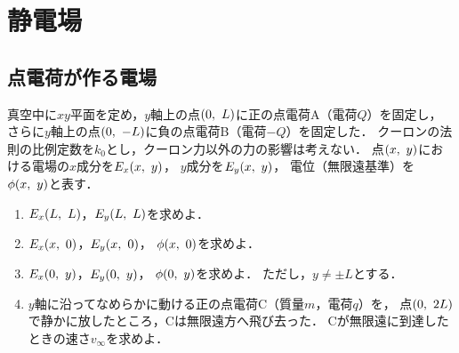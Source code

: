 \documentclass[fleqn,head_space=14mm,foot_space=15mm,gutter=10mm,fore_edge=10mm,
    twocolumn,jafontscale=0.92]{jlreq}
\begin{document}
\section{静電場}

\subsection{点電荷が作る電場}

真空中に$xy$平面を定め，$y$軸上の点$(0, \hspace{1.2mm} L)$に正の点電荷A（電荷$Q$）を固定し，
さらに$y$軸上の点$(0, \hspace{1.2mm} -L)$に負の点電荷B（電荷$-Q$）を固定した．
クーロンの法則の比例定数を$k_0$とし，クーロン力以外の力の影響は考えない．
点$(x, \hspace{1.2mm} y)$における電場の$x$成分を$E_x(x, \hspace{1.2mm} y)$，
$y$成分を$E_y(x, \hspace{1.2mm} y)$，
電位（無限遠基準）を$\phi(x, \hspace{1.2mm} y)$と表す．

\begin{enumerate}

    \item $E_x(L, \hspace{1.2mm} L)$，$E_y(L, \hspace{1.2mm} L)$を求めよ．

    \item $E_x(x, \hspace{1.2mm} 0)$，$E_y(x, \hspace{1.2mm} 0)$，
    $\phi(x, \hspace{1.2mm} 0)$を求めよ．

    \item $E_x(0, \hspace{1.2mm} y)$，$E_y(0, \hspace{1.2mm} y)$，
    $\phi(0, \hspace{1.2mm} y)$を求めよ．
    ただし，$y \neq \pm L$とする．

    \item $y$軸に沿ってなめらかに動ける正の点電荷C（質量$m$，電荷$q$）を，
    点$(0, \hspace{1.2mm} 2L)$で静かに放したところ，Cは無限遠方へ飛び去った．
    Cが無限遠に到達したときの速さ$v_\infty$を求めよ．

\end{enumerate}

\vspace{2cm}
\vfill
\end{document}

